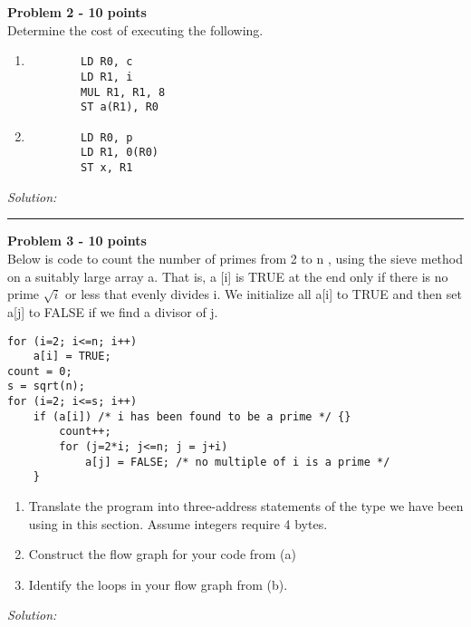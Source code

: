 \documentclass[a4paper, 11pt]{article}
\newenvironment{problem}[2][Problem]
    { \begin{mdframed}[backgroundcolor=gray!20] \textbf{#1 #2} \\}
    {  \end{mdframed}}
\newenvironment{solution}
    {\textit{Solution:}}
    {}
\begin{document}
\begin{problem}{2 - 10 points}
Determine the cost of executing the following.
\begin{enumerate}
    \item \begin{verbatim}
        LD R0, c  
        LD R1, i  
        MUL R1, R1, 8  
        ST a(R1), R0  
    \end{verbatim}
    \item \begin{verbatim}
        LD R0, p  
        LD R1, 0(R0) 
        ST x, R1  
    \end{verbatim}
\end{enumerate}
\end{problem}
\begin{solution}
\end{solution}

\noindent\rule{7in}{2.8pt}


\begin{problem}{3 - 10 points}
Below is code to count the number of primes from 2 to  n , using the sieve method on a suitably large array a. That is, a [i] is TRUE at  the end only if there is no prime $\sqrt i$ or less that evenly divides i. We initialize  all a[i] to TRUE and then set a[j] to FALSE if we find a divisor of j.

\begin{verbatim}
for (i=2; i<=n; i++)    
    a[i] = TRUE;      
count = 0;     
s = sqrt(n);     
for (i=2; i<=s; i++)    
    if (a[i]) /* i has been found to be a prime */ {}  
        count++;    
        for (j=2*i; j<=n; j = j+i)    
            a[j] = FALSE; /* no multiple of i is a prime */  
    }
\end{verbatim}

\begin{enumerate}[a]
    \item Translate the program into three-address statements of the type we have  been using in this section. Assume integers require 4 bytes.
    \item Construct the flow graph for your code from (a)
    \item Identify the loops in your flow graph from (b).

\end{enumerate}
\end{problem}
\begin{solution}
\end{solution}
\end{document}
